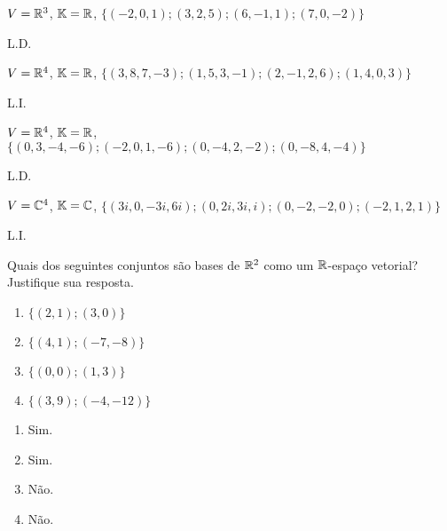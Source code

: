 \documentclass[12pt]{exam}
\begin{document}
    \begin{exercicio}
        $V = \mathbb{R}^3$, $\mathbb{K} = \mathbb{R}$, $\{(-2, 0, 1); (3, 2, 5); (6, -1, 1); (7, 0, -2)\}$
        \begin{solucao}
            L.D.
        \end{solucao}
    \end{exercicio}

    \begin{exercicio}
        $V = \mathbb{R}^4$, $\mathbb{K} = \mathbb{R}$, $\{(3, 8, 7, -3); (1, 5, 3, -1); (2, -1, 2, 6); (1, 4, 0, 3)\}$
        \begin{solucao}
            L.I.
        \end{solucao}
    \end{exercicio}

    \begin{exercicio}
        $V = \mathbb{R}^4$, $\mathbb{K} = \mathbb{R}$, $\{(0, 3, -4, -6); (-2, 0, 1, -6); (0, -4, 2, -2); (0, -8, 4, -4)\}$
        \begin{solucao}
            L.D.
        \end{solucao}
    \end{exercicio}

    \begin{exercicio}\label{fimtesteldli}
        $V = \mathbb{C}^4$, $\mathbb{K} = \mathbb{C}$, $\{(3i, 0, -3i, 6i); (0, 2i, 3i, i); (0, -2, -2, 0); (-2, 1, 2, 1)\}$
        \begin{solucao}
            L.I.
        \end{solucao}
    \end{exercicio}

    \begin{exercicio}
        Quais dos seguintes conjuntos são bases de $\mathbb{R}^2$ como um $\mathbb{R}$-espaço vetorial? Justifique sua resposta.
        \begin{multicols}{2}
            \begin{enumerate}[label={\alph*})]
                \item $\{(2, 1); (3, 0)\}$

                \item $\{(4, 1); (-7, -8)\}$

                \item $\{(0, 0); (1, 3)\}$

                \item $\{(3, 9); (-4, -12)\}$
            \end{enumerate}
        \end{multicols}
        \begin{solucao}
            \begin{enumerate}[label={\alph*})]
                \item Sim.

                \item Sim.

                \item Não.

                \item Não.
            \end{enumerate}
        \end{solucao}
    \end{exercicio}
\end{document}
